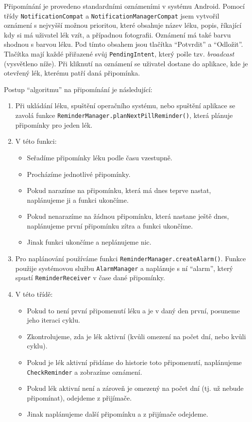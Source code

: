 \documentclass[../TakeYourPill.tex]{subfiles}
\begin{document}
Připomínání je provedeno standardními oznámeními v systému Android. Pomocí třídy \texttt{NotificationCompat} a \texttt{NotificationManagerCompat} jsem vytvořil oznámení s nejvyšší možnou prioritou, které obsahuje název léku, popis, říkající kdy si má uživatel lék vzít, a případnou fotografii. Oznámení má také barvu shodnou s barvou léku. Pod tímto obsahem jsou tlačítka \enquote{Potvrdit} a \enquote{Odložit}. Tlačítka mají každé přiřazené svůj \texttt{PendingIntent}, který pošle tzv. \textit{broadcast} (vysvětleno níže). Při kliknutí na oznámení se uživatel dostane do aplikace, kde je otevřený lék, kterému patří daná připomínka.

Postup \enquote{algoritmu} na připomínání je následující:

\begin{enumerate}
  \item Při ukládání léku, spuštění operačního systému, nebo spuštění aplikace se zavolá funkce \texttt{ReminderManager.planNextPillReminder()}, která plánuje připomínky pro jeden lék.
  \item V této funkci:
  \begin{itemize}
    \item Seřadíme připomínky léku podle času vzestupně.
    \item Procházíme jednotlivé připomínky.
    \item Pokud narazíme na připomínku, která má dnes teprve nastat, naplánujeme ji a funkci ukončíme.
    \item Pokud nenarazíme na žádnou připomínku, která nastane ještě dnes, naplánujeme první připomínku zítra a funkci ukončíme.
    \item Jinak funkci ukončíme a neplánujeme nic.
  \end{itemize}
  \item Pro naplánování používáme funkci \texttt{ReminderManager.createAlarm()}. Funkce použije systémovou službu \texttt{AlarmManager} a naplánuje s ní \enquote{alarm}, který spustí \texttt{ReminderReceiver} v čase dané připomínky.
  \item V této třídě:
  \begin{itemize}
    \item Pokud to není první připomenutí léku a je v daný den první, posuneme jeho iteraci cyklu.
    \item Zkontrolujeme, zda je lék aktivní (kvůli omezení na počet dní, nebo kvůli cyklu).
    \item Pokud je lék aktivní přidáme do historie toto připomenutí, naplánujeme \texttt{CheckReminder} a zobrazíme oznámení.
    \item Pokud lék aktivní není a zároveň je omezený na počet dní (tj. už nebude připomínat), odejdeme z přijímače.
    \item Jinak naplánujeme další připomínku a z přijímače odejdeme.
  \end{itemize}
\end{enumerate}
\end{document}
